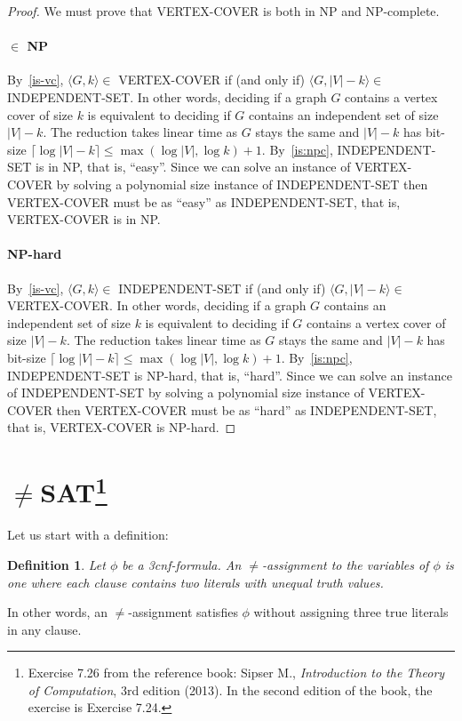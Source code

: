 \documentclass{article}
\newcommand{\definitionname}{Definition}
\newtheorem{definition}{\definitionname}
\newcommand{\card}[1]{|#1|}
\begin{document}
\begin{proof}
  We must prove that VERTEX-COVER is both in NP and NP-complete.
  \paragraph{$\in$ NP}
  By~\ref{is-vc}, $\langle G,k \rangle \in$ VERTEX-COVER if (and only if)
  $\langle G,\card{V}-k\rangle \in$ INDEPENDENT-SET.
  In other words, deciding if a graph $G$ contains a vertex cover of size $k$ is
  equivalent to deciding if $G$ contains an
  independent set of size $\card{V}-k$. The reduction takes linear time as $G$ stays the
  same and $\card{V}-k$ has bit-size $\lceil\log \card{V} - k\rceil \le
  \max(\log\card{V},\log k) + 1$.
  By~\ref{is:npc}, INDEPENDENT-SET is in NP, that is, ``easy''. Since
  we can solve an instance of VERTEX-COVER by solving a polynomial size instance of
  INDEPENDENT-SET then VERTEX-COVER must be as ``easy'' as INDEPENDENT-SET, that
  is, VERTEX-COVER is in NP.

  \paragraph{NP-hard}
  By~\ref{is-vc}, $\langle G,k \rangle \in$ INDEPENDENT-SET if (and only if)
  $\langle G,\card{V}-k\rangle \in$ VERTEX-COVER.
  In other words, deciding if a graph $G$ contains an independent set of size $k$ is
  equivalent to deciding if $G$ contains a
  vertex cover of size $\card{V}-k$. The reduction takes linear time as $G$ stays the
  same and $\card{V}-k$ has bit-size $\lceil\log \card{V} - k\rceil \le
  \max(\log\card{V},\log k) + 1$.
  By~\ref{is:npc}, INDEPENDENT-SET is NP-hard, that is, ``hard''. Since
  we can solve an instance of INDEPENDENT-SET by solving a polynomial size instance of
  VERTEX-COVER then VERTEX-COVER must be as ``hard'' as INDEPENDENT-SET, that
  is, VERTEX-COVER is NP-hard.
\end{proof}

\section{\texorpdfstring{$\ne$SAT\footnote{%
Exercise 7.26 from the reference book: Sipser M.,
\emph{Introduction to the Theory of Computation}, 3rd edition
(2013).
In the second edition of the book, the exercise is Exercise 7.24.
}}{$\ne$SAT}}

Let us start with a definition:
\begin{definition}
  Let $\phi$ be a 3cnf-formula. An $\ne$-assignment to the variables of $\phi$
  is one where each clause contains two literals with unequal truth values.
\end{definition}
In other words, an $\ne$-assignment satisfies $\phi$ without assigning three
true literals in any clause.
\end{document}
